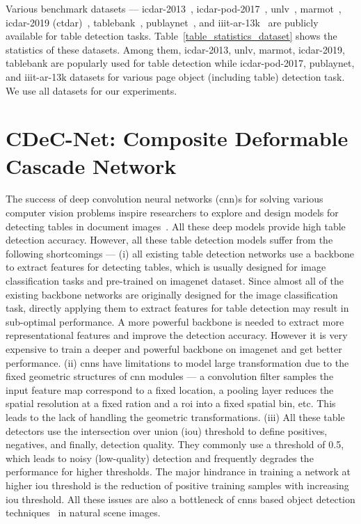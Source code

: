 \documentclass[a4paper,conference]{IEEEtran}
\begin{document}
Various benchmark datasets --- {\sc icdar-2013}~\cite{gobel2013icdar}, {\sc icdar-pod-2017}~\cite{gao2017icdar2017}, {\sc unlv}~\cite{shahab2010open}, {\sc m}armot~\cite{fang2012dataset}, {\sc icdar-2019} (c{\sc td}a{\sc r})~\cite{gao2019icdar}, {\sc t}able{\sc b}ank~\cite{li2019tablebank}, {\sc p}ub{\sc l}ay{\sc n}et~\cite{zhong2019publaynet}, and {\sc iiit-ar-13k}~\cite{ajoy2020_das} are publicly available for table detection tasks. Table~\ref{table_statistics_dataset} shows the statistics of these datasets. Among them, {\sc icdar-2013}, {\sc unlv}, {\sc m}armot, {\sc icdar-2019}, {\sc t}able{\sc b}ank are popularly used for table detection while {\sc icdar-pod-2017}, {\sc p}ub{\sc l}ay{\sc n}et, and {\sc iiit-ar-13k} datasets for various page object (including table) detection task. We use all datasets for our experiments.          

\section{CDeC-Net: Composite Deformable Cascade Network}

The success of deep convolution neural networks ({\sc cnn})s for solving various computer vision problems inspire researchers to explore and design models for detecting tables in document images~\cite{gilani2017table,schreiber2017deepdesrt,siddiqui2018decnt,sun2019faster,vo2018ensemble,arif2018table,li2019tablebank,younas2019ffd,zhong2019publaynet,saha2019graphical,casado2019benefits}. All these deep models provide high table detection accuracy. However, all these table detection models suffer from the following shortcomings --- (i) all existing table detection networks use a backbone to extract features for detecting tables, which is usually designed for image classification tasks and pre-trained on {\sc i}mage{\sc n}et dataset. Since almost all of the existing backbone networks are originally designed for the image classification task, directly applying them to extract features for table detection may result in sub-optimal performance. A more powerful backbone is needed to extract more representational features and improve the detection accuracy. However it is very expensive to train a deeper and powerful backbone on {\sc i}mage{\sc n}et and get better performance. (ii) {\sc cnn}s have limitations to model large transformation due to the fixed geometric structures of {\sc cnn} modules --- a convolution filter samples the input feature map correspond to a fixed location, a pooling layer reduces the spatial resolution at a fixed ration and a {\sc r}o{\sc i} into a fixed spatial bin, etc. This leads to the lack of handling the geometric transformations. (iii) All these table detectors use the intersection over union ({\sc i}o{\sc u}) threshold to define positives, negatives, and finally, detection quality. They commonly use a threshold of 0.5, which leads to noisy (low-quality) detection and frequently degrades the performance for higher thresholds. The major hindrance in training a network at higher {\sc i}o{\sc u} threshold is the reduction of positive training samples with increasing {\sc i}o{\sc u} threshold. All these issues are also a bottleneck of {\sc cnn}s based object detection techniques~\cite{girshick2015fast,ren2015faster,he2017mask} in natural scene images.
\end{document}
